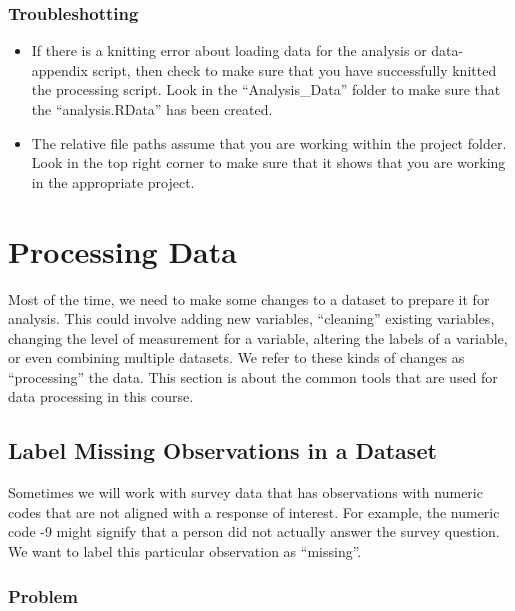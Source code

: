 \documentclass[
]{book}
\providecommand{\tightlist}{%
  \setlength{\itemsep}{0pt}\setlength{\parskip}{0pt}}
\begin{document}
\hypertarget{troubleshotting}{%
\subsection{Troubleshotting}\label{troubleshotting}}

\begin{itemize}
\tightlist
\item
  If there is a knitting error about loading data for the analysis or data-appendix script, then check to make sure that you have successfully knitted the processing script. Look in the ``Analysis\_Data'' folder to make sure that the ``analysis.RData'' has been created.
\item
  The relative file paths assume that you are working within the project folder. Look in the top right corner to make sure that it shows that you are working in the appropriate project.
\end{itemize}

\hypertarget{processing-data}{%
\chapter{Processing Data}\label{processing-data}}

Most of the time, we need to make some changes to a dataset to prepare it for analysis. This could involve adding new variables, ``cleaning'' existing variables, changing the level of measurement for a variable, altering the labels of a variable, or even combining multiple datasets. We refer to these kinds of changes as ``processing'' the data. This section is about the common tools that are used for data processing in this course.

\hypertarget{missing}{%
\section{Label Missing Observations in a Dataset}\label{missing}}

Sometimes we will work with survey data that has observations with numeric codes that are not aligned with a response of interest. For example, the numeric code -9 might signify that a person did not actually answer the survey question. We want to label this particular observation as ``missing''.

\hypertarget{problem-14}{%
\subsection{Problem}\label{problem-14}}
\end{document}
